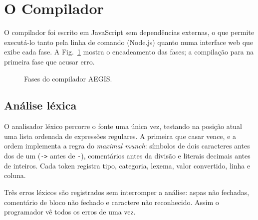 \documentclass[conference]{IEEEtran}
\begin{document}
\section{O Compilador}
\label{sec:compilador}

O compilador foi escrito em JavaScript sem dependências externas, o que
permite executá-lo tanto pela linha de comando (Node.js) quanto numa
interface web que exibe cada fase. A Fig.~\ref{fig:pipeline} mostra o
encadeamento das fases; a compilação para na primeira fase que acusar
erro.

\begin{figure}[htbp]
\centering
{}
\caption{Fases do compilador AEGIS.}
\label{fig:pipeline}
\end{figure}

\subsection{Análise léxica}

O analisador léxico percorre o fonte uma única vez, testando na posição
atual uma lista ordenada de expressões regulares. A primeira que casar
vence, e a ordem implementa a regra do \textit{maximal munch}: símbolos de
dois caracteres antes dos de um (\texttt{->} antes de \texttt{-}),
comentários antes da divisão e literais decimais antes de inteiros. Cada
token registra tipo, categoria, lexema, valor convertido, linha e coluna.

Três erros léxicos são registrados sem interromper a análise: aspas não
fechadas, comentário de bloco não fechado e caractere não reconhecido.
Assim o programador vê todos os erros de uma vez.
\end{document}
